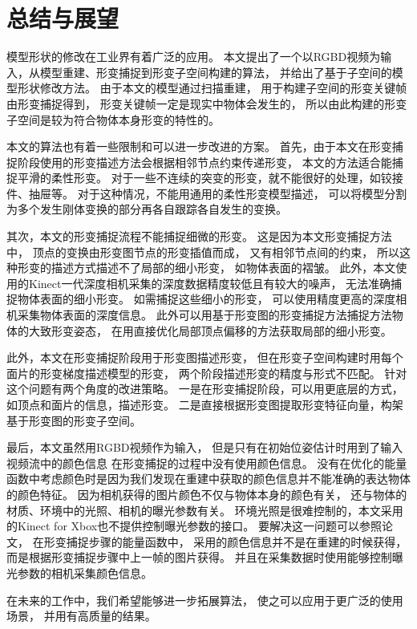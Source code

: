\chapter{总结与展望}
模型形状的修改在工业界有着广泛的应用。
本文提出了一个以RGBD视频为输入，从模型重建、形变捕捉到形变子空间构建的算法，
并给出了基于子空间的模型形状修改方法。
由于本文的模型通过扫描重建，
用于构建子空间的形变关键帧由形变捕捉得到，
形变关键帧一定是现实中物体会发生的，
所以由此构建的形变子空间是较为符合物体本身形变的特性的。

本文的算法也有着一些限制和可以进一步改进的方案。
首先，由于本文在形变捕捉阶段使用的形变描述方法会根据相邻节点约束传递形变，
本文的方法适合能捕捉平滑的柔性形变。
对于一些不连续的突变的形变，就不能很好的处理，如铰接件、抽屉等。
对于这种情况，不能用通用的柔性形变模型描述，
可以将模型分割为多个发生刚体变换的部分再各自跟踪各自发生的变换。

其次，本文的形变捕捉流程不能捕捉细微的形变。
这是因为本文形变捕捉方法中，
顶点的变换由形变图节点的形变插值而成，
又有相邻节点间的约束，
所以这种形变的描述方式描述不了局部的细小形变，
如物体表面的褶皱。
此外，本文使用的Kinect一代深度相机采集的深度数据精度较低且有较大的噪声，
无法准确捕捉物体表面的细小形变。
如需捕捉这些细小的形变，
可以使用精度更高的深度相机采集物体表面的深度信息。
此外可以用基于形变图的形变捕捉方法捕捉方法物体的大致形变姿态，
在用直接优化局部顶点偏移的方法获取局部的细小形变。

此外，本文在形变捕捉阶段用于形变图描述形变，
但在形变子空间构建时用每个面片的形变梯度描述模型的形变，
两个阶段描述形变的精度与形式不匹配。
针对这个问题有两个角度的改进策略。
一是在形变捕捉阶段，可以用更底层的方式，如顶点和面片的信息，描述形变。
二是直接根据形变图提取形变特征向量，构架基于形变图的形变子空间。

最后，本文虽然用RGBD视频作为输入，
但是只有在初始位姿估计时用到了输入视频流中的颜色信息
在形变捕捉的过程中没有使用颜色信息。
没有在优化的能量函数中考虑颜色时是因为我们发现在重建中获取的颜色信息并不能准确的表达物体的颜色特征。
因为相机获得的图片颜色不仅与物体本身的颜色有关，
还与物体的材质、环境中的光照、相机的曝光参数有关。
环境光照是很难控制的，本文采用的Kinect for Xbox也不提供控制曝光参数的接口。
要解决这一问题可以参照论文\cite{zollhofer2014real}，
在形变捕捉步骤的能量函数中，
采用的颜色信息并不是在重建的时候获得，
而是根据形变捕捉步骤中上一帧的图片获得。
并且在采集数据时使用能够控制曝光参数的相机采集颜色信息。

在未来的工作中，我们希望能够进一步拓展算法，
使之可以应用于更广泛的使用场景，
并用有高质量的结果。
